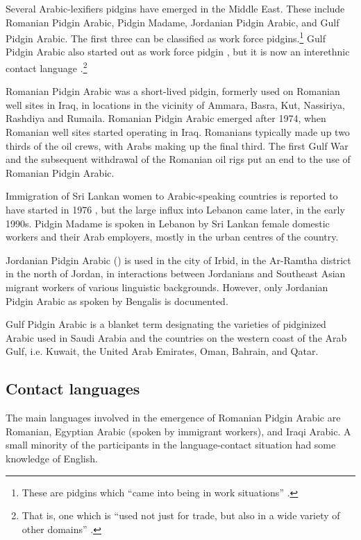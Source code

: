\documentclass[output=paper]{langsci/langscibook}
\begin{document}
Several Arabic-lexifiers pidgins have emerged in the Middle East. These include Romanian Pidgin Arabic, Pidgin Madame, Jordanian Pidgin Arabic, and Gulf Pidgin Arabic. The first three can be classified as work force pidgins.\footnote{These are pidgins which “came into being in work situations” \citep[28]{Bakker1995}.} Gulf Pidgin Arabic also started out as work force pidgin \citep[83]{Smart1990}, but it is now an interethnic contact language \citep[13]{Avram2014Pidgin}.\footnote{That is, one which is “used not just for trade, but also in a wide variety of other domains” \citep[28]{Bakker1995}.}

Romanian Pidgin Arabic \citep{Avram2010} was a short-lived pidgin, formerly used on Romanian well sites in Iraq, in locations in the vicinity of Ammara, Basra, Kut, Nassiriya, Rashdiya and Rumaila. Romanian Pidgin Arabic emerged after 1974, when Romanian well sites started operating in Iraq. Romanians typically made up two thirds of the oil crews, with Arabs making up the final third. The first Gulf War and the subsequent withdrawal of the Romanian oil rigs put an end to the use of Romanian Pidgin Arabic. 

Immigration of Sri Lankan women to Arabic-speaking countries is reported to have started in 1976 \citep[16]{Bizri2010}, but the large influx into Lebanon came later, in the early 1990s. Pidgin Madame is spoken in Lebanon by Sri Lankan female domestic workers and their Arab employers, mostly in the urban centres of the country. 

  Jordanian Pidgin Arabic (\citealt{Al-Salman2013}) is used in the city of Irbid, in the Ar-Ramtha district in the north of Jordan, in interactions between Jordanians and Southeast Asian migrant workers of various linguistic backgrounds. However, only Jordanian Pidgin Arabic as spoken by Bengalis is documented.  

Gulf Pidgin Arabic is a blanket term designating the varieties of pidginized Arabic used in Saudi Arabia and the countries on the western coast of the Arab Gulf, i.e. Kuwait, the United Arab Emirates, Oman, Bahrain, and Qatar. 


 
 \subsection{Contact languages}


The main languages involved in the emergence of Romanian Pidgin Arabic are Romanian, Egyptian Arabic (spoken by immigrant workers), and Iraqi Arabic. A small minority of the participants in the language-contact situation had some knowledge of English.
\end{document}
